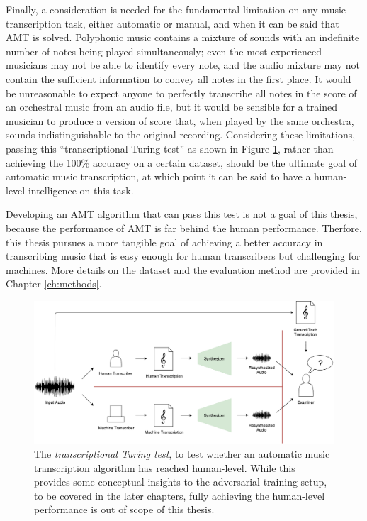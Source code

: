 Finally, a consideration is needed for the fundamental limitation on any music transcription task, either automatic or manual, and when it can be said that AMT is solved.
Polyphonic music contains a mixture of sounds with an indefinite number of notes being played simultaneously; even the most experienced musicians may not be able to identify every note, and the audio mixture may not contain the sufficient information to convey all notes in the first place.
It would be unreasonable to expect anyone to perfectly transcribe all notes in the score of an orchestral music from an audio file, but it would be sensible for a trained musician to produce a version of score that, when played by the same orchestra, sounds indistinguishable to the original recording.
Considering these limitations, passing this ``transcriptional Turing test'' as shown in Figure \ref{fig:turing}, rather than achieving the 100\% accuracy on a certain dataset, should be the ultimate goal of automatic music transcription, at which point it can be said to have a human-level intelligence on this task.

Developing an AMT algorithm that can pass this test is not a goal of this thesis, because the performance of AMT is far behind the human performance.
Therfore, this thesis pursues a more tangible goal of achieving a better accuracy in transcribing music that is easy enough for human transcribers but challenging for machines.
More details on the dataset and the evaluation method are provided in Chapter \ref{ch:methods}.


\begin{figure}
	\includegraphics[width=\textwidth]{turing.pdf}
	\caption{The \emph{transcriptional Turing test}, to test whether an automatic music transcription algorithm has reached human-level. While this provides some conceptual insights to the adversarial training setup, to be covered in the later chapters, fully achieving the human-level performance is out of scope of this thesis.}
	\label{fig:turing}
\end{figure}

